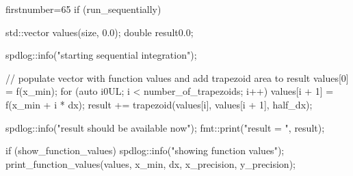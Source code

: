 \begin{cppcode*}{firstnumber=65}
    if (run_sequentially) {
        std::vector values(size, 0.0);
        double result{0.0};

        spdlog::info("starting sequential integration");

        // populate vector with function values and add trapezoid area to result
        values[0] = f(x_min);
        for (auto i{0UL}; i < number_of_trapezoids; i++) {
            values[i + 1] = f(x_min + i * dx);
            result += trapezoid(values[i], values[i + 1], half_dx);
        }

        spdlog::info("result should be available now");
        fmt::print("result = {}\n", result);

        if (show_function_values) {
            spdlog::info("showing function values");
            print_function_values(values, x_min, dx, x_precision, y_precision);
        }
    }
\end{cppcode*}
